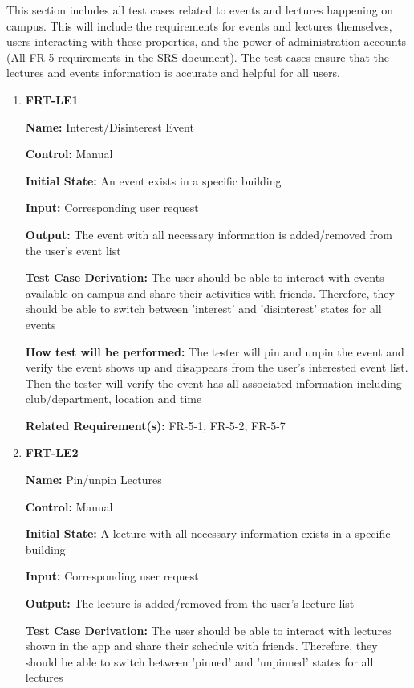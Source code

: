 \documentclass[12pt, titlepage]{article}
\begin{document}
This section includes all test cases related to events and lectures happening on campus. This will include the requirements for events and lectures themselves, users interacting with these properties, and the power of administration accounts (All FR-5 requirements in the SRS document). The test cases ensure that the lectures and events information is accurate and helpful for all users.

\begin{enumerate}
\item{\textbf{FRT-LE1}}

\textbf{Name:} Interest/Disinterest Event

\textbf{Control:} Manual
					
\textbf{Initial State:} An event exists in a specific building

\textbf{Input:} Corresponding user request
					
\textbf{Output:} The event with all necessary information is added/removed from the user's event list

\textbf{Test Case Derivation:} The user should be able to interact with events available on campus and share their activities with friends. Therefore, they should be able to switch between 'interest' and 'disinterest' states for all events 
					
\textbf{How test will be performed:} The tester will pin and unpin the event and verify the event shows up and disappears from the user's interested event list. Then the tester will verify the event has all associated information including club/department, location and time

\textbf{Related Requirement(s):} FR-5-1, FR-5-2, FR-5-7

\item{\textbf{FRT-LE2}}

\textbf{Name:} Pin/unpin Lectures

\textbf{Control:} Manual
					
\textbf{Initial State:} A lecture with all necessary information exists in a specific building

\textbf{Input:} Corresponding user request
					
\textbf{Output:} The lecture is added/removed from the user's lecture list

\textbf{Test Case Derivation:} The user should be able to interact with lectures shown in the app and share their schedule with friends. Therefore, they should be able to switch between 'pinned' and 'unpinned' states for all lectures 
					

\end{enumerate}
\end{document}
